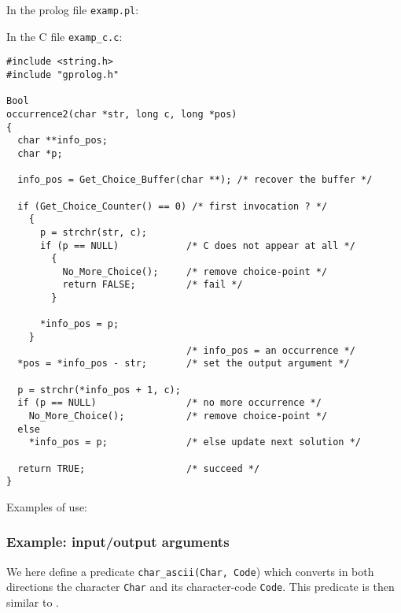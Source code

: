 In the prolog file \texttt{examp.pl}:


In the C file \texttt{examp\_c.c}:

\begin{Indentation}
\begin{verbatim}
#include <string.h>
#include "gprolog.h"

Bool
occurrence2(char *str, long c, long *pos)
{
  char **info_pos;
  char *p;

  info_pos = Get_Choice_Buffer(char **); /* recover the buffer */

  if (Get_Choice_Counter() == 0) /* first invocation ? */
    {
      p = strchr(str, c);
      if (p == NULL)            /* C does not appear at all */
        {
          No_More_Choice();     /* remove choice-point */
          return FALSE;         /* fail */
        }

      *info_pos = p;
    }
                                /* info_pos = an occurrence */
  *pos = *info_pos - str;       /* set the output argument */

  p = strchr(*info_pos + 1, c);
  if (p == NULL)                /* no more occurrence */
    No_More_Choice();           /* remove choice-point */
  else
    *info_pos = p;              /* else update next solution */

  return TRUE;                  /* succeed */
}
\end{verbatim}
\end{Indentation}

Examples of use:

\begin{CodeTwoCols}
\SkipLine
{}
\SkipLine
{}
\SkipLine
{}
\SkipLine
{}
\end{CodeTwoCols}

\subsubsection{Example: input/output arguments}
We here define a predicate \texttt{char\_ascii(Char, Code}) which converts
in both directions the character \texttt{Char} and its character-code
\texttt{Code}. This predicate is then similar to 
.

